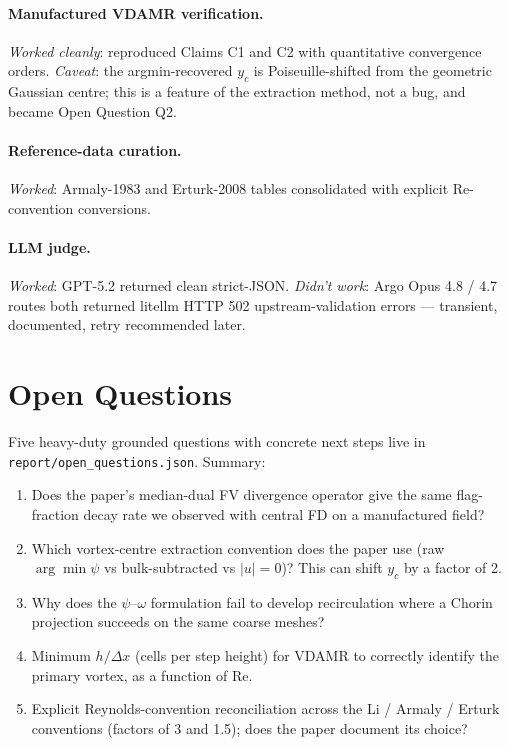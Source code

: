 \documentclass[11pt,letterpaper]{article}
\begin{document}
\paragraph{Manufactured VDAMR verification.} \emph{Worked cleanly}: reproduced Claims C1
and C2 with quantitative convergence orders. \emph{Caveat}: the argmin-recovered $y_c$ is
Poiseuille-shifted from the geometric Gaussian centre; this is a feature of the
extraction method, not a bug, and became Open Question Q2.

\paragraph{Reference-data curation.} \emph{Worked}: Armaly-1983 and Erturk-2008 tables
consolidated with explicit Re-convention conversions.

\paragraph{LLM judge.} \emph{Worked}: GPT-5.2 returned clean strict-JSON. \emph{Didn't
work}: Argo Opus 4.8 / 4.7 routes both returned litellm HTTP 502 upstream-validation
errors --- transient, documented, retry recommended later.

\section{Open Questions}
Five heavy-duty grounded questions with concrete next steps live in
\texttt{report/open\_questions.json}. Summary:
\begin{enumerate}
  \item Does the paper's median-dual FV divergence operator give the same flag-fraction
        decay rate we observed with central FD on a manufactured field?
  \item Which vortex-centre extraction convention does the paper use (raw
        $\arg\min\psi$ vs bulk-subtracted vs $|u|=0$)? This can shift $y_c$ by a factor
        of 2.
  \item Why does the $\psi$--$\omega$ formulation fail to develop recirculation where a
        Chorin projection succeeds on the same coarse meshes?
  \item Minimum $h/\Delta x$ (cells per step height) for VDAMR to correctly identify the
        primary vortex, as a function of Re.
  \item Explicit Reynolds-convention reconciliation across the Li / Armaly / Erturk
        conventions (factors of 3 and 1.5); does the paper document its choice?
\end{enumerate}
\end{document}
